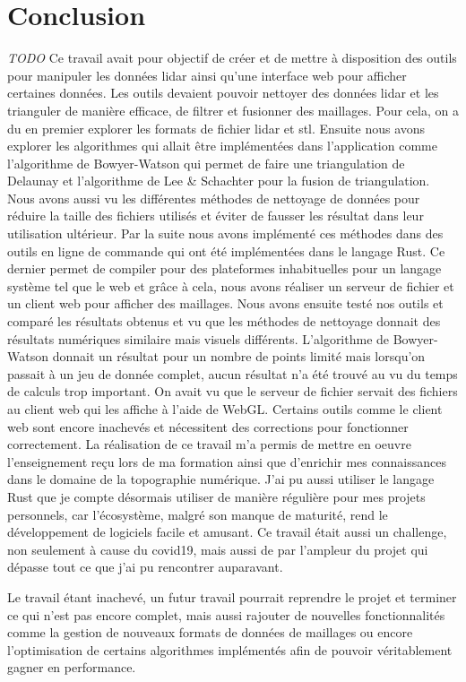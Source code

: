 \chapter*{Conclusion}

\textit{TODO}
Ce travail avait pour objectif de créer et de mettre à disposition des outils pour manipuler les données \gls{lidar} ainsi qu'une interface web pour afficher certaines données.
Les outils devaient pouvoir nettoyer des données \gls{lidar} et les trianguler de manière efficace, de filtrer et fusionner des maillages.
Pour cela, on a du en premier explorer les formats de fichier \gls{lidar} et
\gls{stl}.
Ensuite nous avons explorer les algorithmes qui allait être implémentées dans
l'application comme l'algorithme de Bowyer-Watson qui permet de faire une
triangulation de Delaunay et l'algorithme de Lee \& Schachter pour la fusion de
triangulation. Nous avons aussi vu les différentes méthodes de nettoyage de
données pour réduire la taille des fichiers utilisés et éviter de fausser les
résultat dans leur utilisation ultérieur. Par la suite nous avons implémenté ces
méthodes dans des outils en ligne de commande qui ont été implémentées dans le langage Rust.
Ce dernier permet de compiler pour des plateformes inhabituelles pour un langage système tel que le web et grâce à cela,
nous avons réaliser un serveur de fichier et un client web pour afficher des
maillages.
Nous avons ensuite testé nos outils et comparé les résultats obtenus et
vu que les méthodes de nettoyage donnait des résultats numériques similaire mais
visuels différents. L'algorithme de Bowyer-Watson donnait un résultat pour
un nombre de points limité mais lorsqu'on passait à un jeu de donnée complet, aucun
résultat n'a été trouvé au vu du temps de calculs trop important. 
On avait vu que le serveur de fichier servait des fichiers au client web qui les
affiche à l'aide de WebGL.
Certains outils comme le client web sont encore inachevés et nécessitent des corrections pour fonctionner correctement.
La réalisation de ce travail m'a permis de mettre en oeuvre l'enseignement reçu lors de ma formation ainsi que d'enrichir mes connaissances dans le domaine de la topographie numérique.
J'ai pu aussi utiliser le langage Rust que je compte désormais utiliser de manière régulière pour mes projets personnels, car l'écosystème, malgré son manque de maturité, rend le développement de logiciels facile et amusant.
Ce travail était aussi un challenge, non seulement à cause du covid19, mais aussi de par l'ampleur du projet qui dépasse tout ce que j'ai pu rencontrer auparavant.

Le travail étant inachevé, un futur travail pourrait reprendre le projet et
terminer ce qui n'est pas encore complet, mais aussi rajouter de nouvelles
fonctionnalités comme la gestion de nouveaux formats de données de maillages ou encore l'optimisation de certains algorithmes implémentés afin de pouvoir véritablement gagner en performance.
